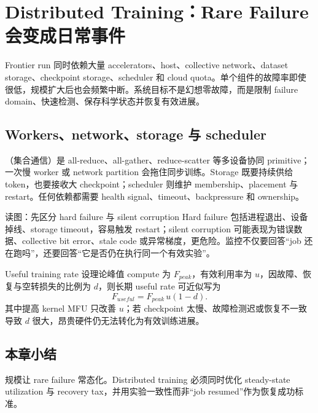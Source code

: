 \section{Distributed Training：Rare Failure 会变成日常事件}

Frontier run 同时依赖大量 accelerators、host、collective network、dataset storage、checkpoint storage、scheduler 和 cloud quota。单个组件的故障率即使很低，规模扩大后也会频繁中断。系统目标不是幻想零故障，而是限制 failure domain、快速检测、保存科学状态并恢复有效进展。

\subsection{Workers、network、storage 与 scheduler}

（集合通信）是 all-reduce、all-gather、reduce-scatter 等多设备协同 primitive；一次慢 worker 或 network partition 会拖住同步训练。Storage 既要持续供给 token，也要接收大 checkpoint；scheduler 则维护 membership、placement 与 restart。任何依赖都需要 health signal、timeout、backpressure 和 ownership。


\begin{knowledgebox}{读图：先区分 hard failure 与 silent corruption}
Hard failure 包括进程退出、设备掉线、storage timeout，容易触发 restart；silent corruption 可能表现为错误数据、collective bit error、stale code 或异常梯度，更危险。监控不仅要回答“job 还在跑吗”，还要回答“它是否仍在执行同一个有效实验”。
\end{knowledgebox}

\begin{importantbox}{Useful training rate}
设理论峰值 compute 为 $F_{peak}$，有效利用率为 $u$，因故障、恢复与空转损失的比例为 $d$，则长期 useful rate 可近似写为
\[
F_{useful}=F_{peak}\,u(1-d).
\]
其中提高 kernel MFU 只改善 $u$；若 checkpoint 太慢、故障检测迟或恢复不一致导致 $d$ 很大，昂贵硬件仍无法转化为有效训练进展。
\end{importantbox}

\subsection{本章小结}

规模让 rare failure 常态化。Distributed training 必须同时优化 steady-state utilization 与 recovery tax，并用实验一致性而非“job resumed”作为恢复成功标准。

